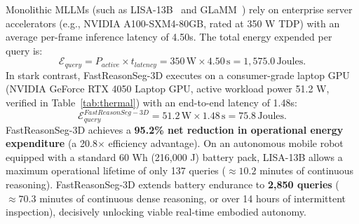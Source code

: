 \documentclass[10pt,twocolumn,letterpaper]{article}
\begin{document}
Monolithic MLLMs (such as LISA-13B~\cite{lai2023lisa} and GLaMM~\cite{rasheed2024glamm}) rely on enterprise server accelerators (e.g., NVIDIA A100-SXM4-80GB, rated at 350 W TDP) with an average per-frame inference latency of 4.50s. The total energy expended per query is:
\begin{equation}
\mathcal{E}_{query} = P_{active} \times t_{latency} = 350\,\text{W} \times 4.50\,\text{s} = 1,575.0\,\text{Joules}.
\end{equation}
In stark contrast, FastReasonSeg-3D executes on a consumer-grade laptop GPU (NVIDIA GeForce RTX 4050 Laptop GPU, active workload power 51.2 W, verified in Table~\ref{tab:thermal}) with an end-to-end latency of 1.48s:
\begin{equation}
\mathcal{E}_{query}^{FastReasonSeg-3D} = 51.2\,\text{W} \times 1.48\,\text{s} = 75.8\,\text{Joules}.
\end{equation}
FastReasonSeg-3D achieves a \textbf{95.2\% net reduction in operational energy expenditure} (a 20.8$\times$ efficiency advantage). On an autonomous mobile robot equipped with a standard 60 Wh (216,000 J) battery pack, LISA-13B allows a maximum operational lifetime of only 137 queries ($\approx 10.2$ minutes of continuous reasoning). FastReasonSeg-3D extends battery endurance to \textbf{2,850 queries} ($\approx 70.3$ minutes of continuous dense reasoning, or over 14 hours of intermittent inspection), decisively unlocking viable real-time embodied autonomy.
\end{document}
